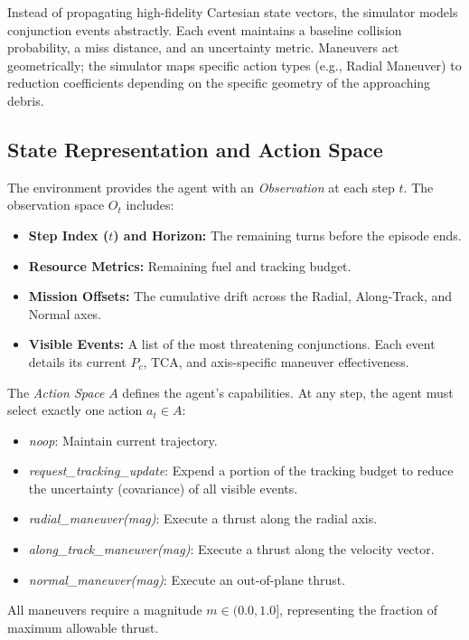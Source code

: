 \documentclass[10pt,journal,compsoc]{IEEEtran}
\begin{document}
Instead of propagating high-fidelity Cartesian state vectors, the simulator models conjunction events abstractly. Each event maintains a baseline collision probability, a miss distance, and an uncertainty metric. Maneuvers act geometrically; the simulator maps specific action types (e.g., Radial Maneuver) to reduction coefficients depending on the specific geometry of the approaching debris.

\subsection{State Representation and Action Space}
The environment provides the agent with an \textit{Observation} at each step $t$. The observation space $O_t$ includes:
\begin{itemize}
    \item \textbf{Step Index ($t$) and Horizon:} The remaining turns before the episode ends.
    \item \textbf{Resource Metrics:} Remaining fuel and tracking budget.
    \item \textbf{Mission Offsets:} The cumulative drift across the Radial, Along-Track, and Normal axes.
    \item \textbf{Visible Events:} A list of the most threatening conjunctions. Each event details its current $P_c$, TCA, and axis-specific maneuver effectiveness.
\end{itemize}

The \textit{Action Space} $A$ defines the agent's capabilities. At any step, the agent must select exactly one action $a_t \in A$:
\begin{itemize}
    \item \textit{noop}: Maintain current trajectory.
    \item \textit{request\_tracking\_update}: Expend a portion of the tracking budget to reduce the uncertainty (covariance) of all visible events.
    \item \textit{radial\_maneuver(mag)}: Execute a thrust along the radial axis.
    \item \textit{along\_track\_maneuver(mag)}: Execute a thrust along the velocity vector.
    \item \textit{normal\_maneuver(mag)}: Execute an out-of-plane thrust.
\end{itemize}
All maneuvers require a magnitude $m \in (0.0, 1.0]$, representing the fraction of maximum allowable thrust.
\end{document}
